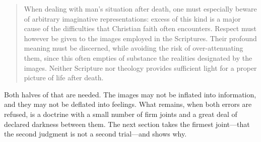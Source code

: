 \begin{quote}
When dealing with man's situation after death, one must especially beware of arbitrary imaginative representations: excess of this kind is a major cause of the difficulties that Christian faith often encounters. Respect must however be given to the images employed in the Scriptures. Their profound meaning must be discerned, while avoiding the risk of over-attenuating them, since this often empties of substance the realities designated by the images. Neither Scripture nor theology provides sufficient light for a proper picture of life after death.
\end{quote}

Both halves of that are needed. The images may not be inflated into information, and they may not be deflated into feelings. What remains, when both errors are refused, is a doctrine with a small number of firm joints and a great deal of declared darkness between them. The next section takes the firmest joint---that the second judgment is not a second trial---and shows why.
